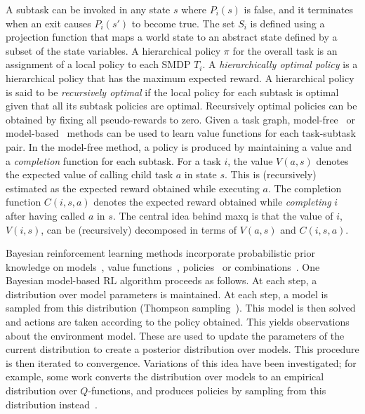A subtask can be invoked in any state $s$ where $P_i(s)$ is false, and
it terminates when an exit causes $P_i(s')$ to become true.  The set
$S_i$ is defined using a projection function that maps a world state
to an abstract state defined by a subset of the state variables. %
  A hierarchical policy $\pi$ for the
overall task is an assignment of a local policy to each SMDP $T_i$.  A
\textit{hierarchically optimal policy} is a 
hierarchical policy that has the maximum expected reward.  A
hierarchical policy is said to be \textit{recursively optimal} if the
local policy for each subtask is optimal given that all its subtask
policies are optimal.  Recursively optimal policies can be obtained by
fixing all pseudo-rewards to zero. Given a task graph,
model-free~\cite{d-hrl-00} or model-based~\cite{rmax-maxq} methods can
be used to learn value functions for each task-subtask pair.
In the model-free method, a policy is produced
by maintaining a value and a {\em completion} function for each
subtask. For a task $i$, the value $V(a,s)$ denotes the expected value
of calling child task $a$ in state $s$. This is (recursively)
estimated as the expected reward obtained while executing
$a$. The completion function $C(i,s,a)$ denotes the expected
 reward obtained while {\em completing} $i$ after having
called $a$ in $s$. The central idea behind {\sc maxq} is that the
value of $i$, $V(i,s)$, can be (recursively) decomposed in terms of
$V(a,s)$ and $C(i,s,a)$. 

Bayesian reinforcement learning methods incorporate probabilistic
prior knowledge on models~\cite{dearden.uai99}, value
functions~\cite{Dearden98,Engel03},
policies~\cite{Ghavamzadeh07bayesianpolicy} or
combinations~\cite{ghavamzadeh:icml07}. One Bayesian model-based
RL algorithm proceeds as follows. At each step, a distribution over
model parameters is maintained.  At each step, a model is sampled from this distribution
(Thompson sampling~\cite{Thompson, Strens}). This model is then solved
and actions are taken according to the policy obtained. This yields
observations about the environment model. These are used
to update the parameters of the current distribution to create a
posterior distribution over models. This procedure is then iterated to convergence.
Variations of this idea have been investigated; for
example, some work converts the distribution over models to an
empirical distribution over $Q$-functions, and produces policies by
sampling from this distribution instead~\cite{dearden.uai99}.

